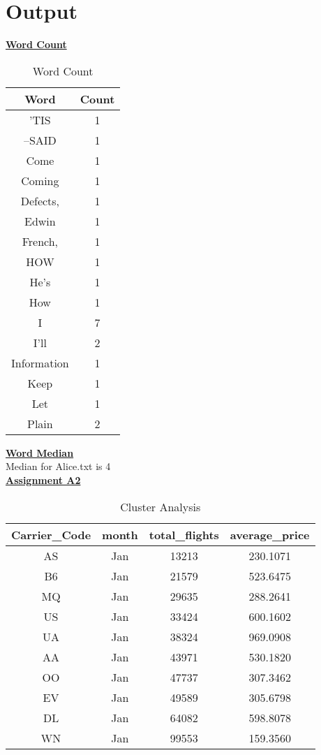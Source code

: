 \documentclass{article}
\begin{document}
\pagebreak
\section{Output}

\textbf{\large{\underline{Word Count}}}\\

\begin{table}[ht]
    \caption{Word Count}
    \centering
    \begin{tabular}{c|c}
    \hline \hline
    Word & Count\\
    \hline
'TIS &  1\\
--SAID &    1\\
Come &  1\\
Coming &    1\\
Defects, &  1\\
Edwin & 1\\
French, &   1\\
HOW &   1\\
He's &  1\\
How &   1\\
I & 7\\
I'll &  2\\
Information &   1\\
Keep &  1\\
Let &   1\\
Plain & 2\\
    \hline
    \end{tabular}
\end{table}



\textbf{\large{\underline{Word Median}}}\\

Median for Alice.txt is 4\\

\textbf{\large{\underline{Assignment A2}}}\\

\begin{table}[ht]
    \caption{Cluster Analysis}
    \centering
    \begin{tabular}{c|c|c|c}
    \hline \hline
    Carrier\_Code & month & total\_flights & average\_price\\
    \hline
AS &  Jan &  13213  &  230.1071\\ 
B6 &  Jan &  21579  &  523.6475\\ 
MQ &  Jan &  29635  & 288.2641\\
US &  Jan &  33424  & 600.1602\\
UA &  Jan &  38324  & 969.0908\\
AA &  Jan &  43971  & 530.1820\\
OO &  Jan &  47737  & 307.3462\\
EV &  Jan &  49589  & 305.6798\\
DL &  Jan &  64082  & 598.8078\\
WN &  Jan &  99553  & 159.3560\\
    \hline
    \end{tabular}
\end{table}
\end{document}

